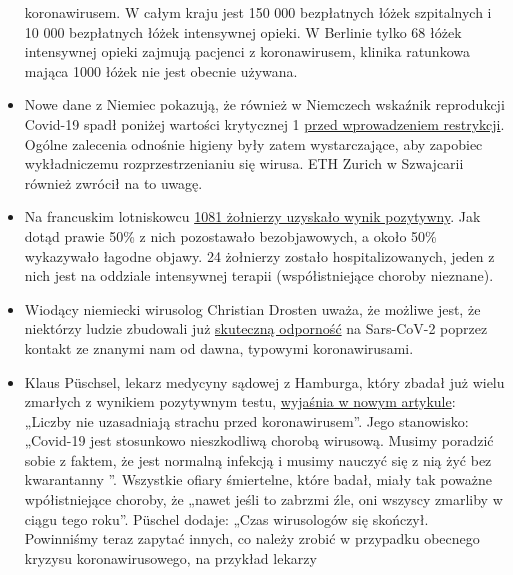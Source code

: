 \begin{itemize}
  koronawirusem. W całym kraju jest 150 000 bezpłatnych łóżek
  szpitalnych i 10 000 bezpłatnych łóżek intensywnej opieki. W Berlinie
  tylko 68 łóżek intensywnej opieki zajmują pacjenci z koronawirusem,
  klinika ratunkowa mająca 1000 łóżek nie jest obecnie używana.
\item
  Nowe dane z Niemiec pokazują, że również w Niemczech wskaźnik
  reprodukcji Covid-19 spadł poniżej wartości krytycznej 1
  \href{https://www.rki.de/DE/Content/Infekt/EpidBull/Archiv/2020/Ausgaben/17_20_SARS-CoV2_vorab.pdf?__blob=publicationFile\#page=5}{przed
  wprowadzeniem restrykcji}. Ogólne zalecenia odnośnie higieny były
  zatem wystarczające, aby zapobiec wykładniczemu rozprzestrzenianiu się
  wirusa. ETH Zurich w Szwajcarii również zwrócił na to uwagę.
\item
  Na francuskim lotniskowcu
  \href{https://www.ouest-france.fr/sante/virus/coronavirus/coronavirus-au-moins-940-marins-positifs-sur-le-charles-de-gaulle-et-son-escorte-6810816}{1081
  żołnierzy uzyskało wynik pozytywny}. Jak dotąd prawie 50\% z nich
  pozostawało bezobjawowych, a około 50\% wykazywało łagodne objawy. 24
  żołnierzy zostało hospitalizowanych, jeden z nich jest na oddziale
  intensywnej terapii (współistniejące choroby nieznane).
\item
  Wiodący niemiecki wirusolog Christian Drosten uważa, że możliwe jest,
  że niektórzy ludzie zbudowali już
  \href{https://www.watson.de/!324026684}{skuteczną odporność} na
  Sars-CoV-2 poprzez kontakt ze znanymi nam od dawna, typowymi
  koronawirusami.
\item
  Klaus Püschsel, lekarz medycyny sądowej z Hamburga, który zbadał już
  wielu zmarłych z wynikiem pozytywnym testu,
  \href{https://www.abendblatt.de/hamburg/article228908865/hamburg-corona-virus-uke-infektion-covid-19-pueschel-coronavirus-krise-patienten-impfstoff-immunitaet-krankenhaeuser-kontaktverbot-kliniken-infektionsrate-krankheit-pandemie-test-lungenkrankheit-sars-cov-epidemie-sars-cov-2.html}{wyjaśnia
  w nowym artykule}: „Liczby nie uzasadniają strachu przed
  koronawirusem''. Jego stanowisko: „Covid-19 jest stosunkowo
  nieszkodliwą chorobą wirusową. Musimy poradzić sobie z faktem, że jest
  normalną infekcją i musimy nauczyć się z nią żyć bez kwarantanny ''.
  Wszystkie ofiary śmiertelne, które badał, miały tak poważne
  wpółistniejące choroby, że „nawet jeśli to zabrzmi źle, oni wszyscy
  zmarliby w ciągu tego roku''. Püschel dodaje: „Czas wirusologów się
  skończył. Powinniśmy teraz zapytać innych, co należy zrobić w
  przypadku obecnego kryzysu koronawirusowego, na przykład lekarzy

\end{itemize}
